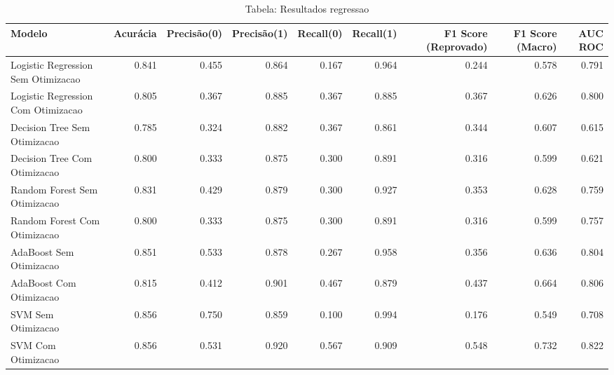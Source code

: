 \begin{table}[H] %
    \centering
    \caption{Tabela: Resultados regressao}
    \label{tab:resultados_regressao}
    \renewcommand{\arraystretch}{1.25} %
    \begin{adjustwidth}{ -1in }{ -1in } %
    \centering %
    \small %
    \begin{tabular}{lrrrrrrrr}
\toprule
                            Modelo &  Acurácia &  Precisão(0) &  Precisão(1) &  Recall(0) &  Recall(1) &  F1 Score (Reprovado) &  F1 Score (Macro) &  AUC ROC \\
\midrule
Logistic Regression Sem Otimizacao &     0.841 &        0.455 &        0.864 &      0.167 &      0.964 &                 0.244 &             0.578 &    0.791 \\
Logistic Regression Com Otimizacao &     0.805 &        0.367 &        0.885 &      0.367 &      0.885 &                 0.367 &             0.626 &    0.800 \\
      Decision Tree Sem Otimizacao &     0.785 &        0.324 &        0.882 &      0.367 &      0.861 &                 0.344 &             0.607 &    0.615 \\
      Decision Tree Com Otimizacao &     0.800 &        0.333 &        0.875 &      0.300 &      0.891 &                 0.316 &             0.599 &    0.621 \\
      Random Forest Sem Otimizacao &     0.831 &        0.429 &        0.879 &      0.300 &      0.927 &                 0.353 &             0.628 &    0.759 \\
      Random Forest Com Otimizacao &     0.800 &        0.333 &        0.875 &      0.300 &      0.891 &                 0.316 &             0.599 &    0.757 \\
           AdaBoost Sem Otimizacao &     0.851 &        0.533 &        0.878 &      0.267 &      0.958 &                 0.356 &             0.636 &    0.804 \\
           AdaBoost Com Otimizacao &     0.815 &        0.412 &        0.901 &      0.467 &      0.879 &                 0.437 &             0.664 &    0.806 \\
                SVM Sem Otimizacao &     0.856 &        0.750 &        0.859 &      0.100 &      0.994 &                 0.176 &             0.549 &    0.708 \\
                SVM Com Otimizacao &     0.856 &        0.531 &        0.920 &      0.567 &      0.909 &                 0.548 &             0.732 &    0.822 \\
\bottomrule
\end{tabular}
    \end{adjustwidth}
    \renewcommand{\arraystretch}{1.0} %
\end{table}
